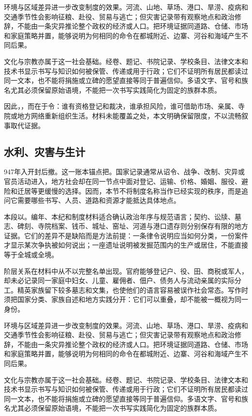 环境与区域差异进一步改变制度的效果。河流、山地、草场、港口、旱涝、疫病和交通季节性会影响征粮、赴役、贸易与逃亡；但灾害记录带有观察地点和政治修辞，不能由一条灾异推论整个政权的经济或人口。把环境证据同道路、仓储、市场和家庭策略并置，能够说明为何相同的命令在都城附近、边寨、河谷和海域产生不同后果。

文化与宗教亦属于这一社会基础。经卷、题记、书院记录、学校条目、法律文本和技术书显示书写与知识如何被保管、传递或用于行政；它们不证明所有居民都读过同一文本，也不能将捐施或立碑的愿望直接等同于普遍信仰。多语文字、官号和族名尤其必须保留原始语境，不能把一次书写实践简化为固定的族群本质。

因此，，而在于令：谁有资格登记和裁决，谁承担风险，谁可借助市场、亲属、寺院或地方网络重新组织生活。材料未能覆盖之处，本文明确保留限度，不以流畅叙事取代证据。

\subsection{水利、灾害与生计}

947年入开封后撤。这一账本锚点把。国家记录通常从诏令、战争、改制、灾异或官员活动进入，地方社会却在同一节点中面对登记、运输、价格、婚姻、服役、避险和迁居等更缓慢的选择。因而，本节不将制度名称当作已经实现的秩序，而是追问它需要哪些书写、人员、道路和资源才能抵达具体地点。

本段以。编年、本纪和制度材料适合确认政治年序与规范语言；契约、讼牍、墓志、碑刻、寺院档案、钱币、城址、窑址、河道与港口遗存则分别保存有限的地方证据。它们的差异不是缺陷而是方法前提：一条律令说明应当如何分类，一份案件才显示某次争执被如何说出；一座遗址说明被发掘范围内的生产或居住，不能直接等于全城或全境。

阶层关系在材料中从不以完整名单出现。官府能够登记户、役、田、商税或军人，却未必记录同一家庭中妇女、儿童、雇佣者、佃户、债务人与流动亲属的实际分工。精英家族留下较多墓志和文集，也使他们的语言容易被误作社会常态。写作时须把国家分类、家族自述和地方实践分开：它们可以重叠，却不能被一概视为同一身份。

环境与区域差异进一步改变制度的效果。河流、山地、草场、港口、旱涝、疫病和交通季节性会影响征粮、赴役、贸易与逃亡；但灾害记录带有观察地点和政治修辞，不能由一条灾异推论整个政权的经济或人口。把环境证据同道路、仓储、市场和家庭策略并置，能够说明为何相同的命令在都城附近、边寨、河谷和海域产生不同后果。

文化与宗教亦属于这一社会基础。经卷、题记、书院记录、学校条目、法律文本和技术书显示书写与知识如何被保管、传递或用于行政；它们不证明所有居民都读过同一文本，也不能将捐施或立碑的愿望直接等同于普遍信仰。多语文字、官号和族名尤其必须保留原始语境，不能把一次书写实践简化为固定的族群本质。

